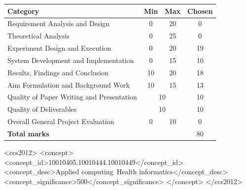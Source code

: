 \documentclass{sig-alternate-05-2015}
\begin{document}
	\renewcommand{\arraystretch}{1.25}
	\begin{tabular}{|l|c|c|c|}
		\hline
		\textbf{Category} & \textbf{Min} & \textbf{Max} & \textbf{Chosen} \\ \hline \hline
		Requirement Analysis and Design & 0 & 20 &
		0 \\ \hline
		Theoretical Analysis & 0 & 25 &
		0 \\ \hline
		Experiment Design and Execution & 0 & 20 &
		19 \\ \hline
		System Development and Implementation & 0 & 15 &
		10 \\ \hline
		Results, Findings and Conclusion & 10 & 20 &
		18 \\ \hline
		Aim Formulation and Background Work & 10 & 15 &
		13 \\ \hline
		Quality of Paper Writing and Presentation & \multicolumn{2}{c|}{10} &
		10 \\ \hline
		Quality of Deliverables & \multicolumn{2}{c|}{10} &
		10 \\ \hline
		Overall General Project Evaluation & 0 & 10 &
		0\\ \hline
		\hline
		\multicolumn{3}{|l|}{\textbf{Total marks}} & 80 \\ \hline
	\end{tabular}
	
	\endgroup
	\thispagestyle{empty}
	\newpage
	\setcounter{page}{1}
	
	
	
	\begin{CCSXML}
	 	<ccs2012>
	 	<concept>
	 	<concept_id>10010405.10010444.10010449</concept_id>
	 	<concept_desc>Applied computing~Health informatics</concept_desc>
	 	<concept_significance>500</concept_significance>
	 	</concept>
	 	</ccs2012>
	\end{CCSXML}

	
	
	
	
	
	
\end{document}
